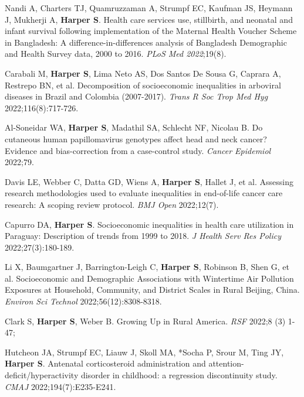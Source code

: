 \documentclass[
  letterpaper,
  DIV=11,
  numbers=noendperiod]{scrartcl}
\begin{document}
\begin{etaremune}
\item Nandi A, Charters TJ, Quamruzzaman A, Strumpf EC, Kaufman JS, Heymann J, Mukherji A, \textbf{Harper S}. Health care services use, stillbirth, and neonatal and infant survival following implementation of the Maternal Health Voucher Scheme in Bangladesh: A difference-in-differences analysis of Bangladesh Demographic and Health Survey data, 2000 to 2016. \emph{PLoS Med 2022};19(8).

\item Carabali M, \textbf{Harper S}, Lima Neto AS, Dos Santos De Sousa G, Caprara A, Restrepo BN, et al. Decomposition of socioeconomic inequalities in arboviral diseases in Brazil and Colombia (2007-2017). \emph{Trans R Soc Trop Med Hyg} 2022;116(8):717-726.

\item *Al-Soneidar WA, \textbf{Harper S}, Madathil SA, Schlecht NF, Nicolau B. Do cutaneous human papillomavirus genotypes affect head and neck cancer? Evidence and bias-correction from a case-control study. \emph{Cancer Epidemiol} 2022;79.

\item Davis LE, Webber C, Datta GD, Wiens A, \textbf{Harper S}, Hallet J, et al. Assessing research methodologies used to evaluate inequalities in end-of-life cancer care research: A scoping review protocol. \emph{BMJ Open} 2022;12(7).

\item *Capurro DA, \textbf{Harper S}. Socioeconomic inequalities in health care utilization in Paraguay: Description of trends from 1999 to 2018. \emph{J Health Serv Res Policy} 2022;27(3):180-189.

\item Li X, Baumgartner J, Barrington-Leigh C, \textbf{Harper S}, Robinson B, Shen G, et al. Socioeconomic and Demographic Associations with Wintertime Air Pollution Exposures at Household, Community, and District Scales in Rural Beijing, China. \emph{Environ Sci Technol} 2022;56(12):8308-8318.

\item Clark S, \textbf{Harper S}, Weber B. Growing Up in Rural America. \emph{RSF} 2022;8 (3) 1-47; 

\item Hutcheon JA, Strumpf EC, Liauw J, Skoll MA, *Socha P, Srour M, Ting JY, \textbf{Harper S}. Antenatal corticosteroid administration and attention-deficit/hyperactivity disorder in childhood: a regression discontinuity study. \emph{CMAJ} 2022;194(7):E235-E241.


\end{etaremune}
\end{document}
